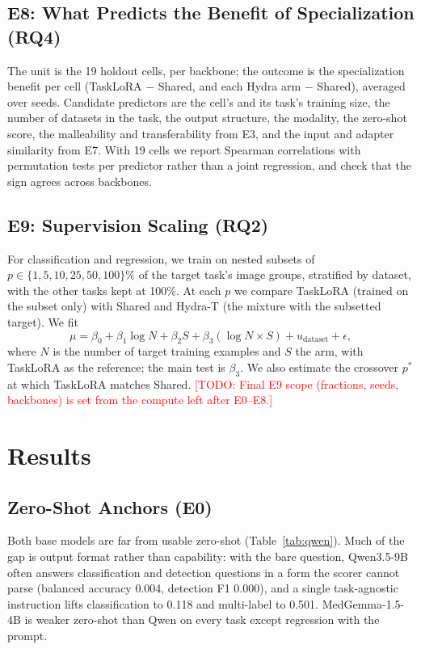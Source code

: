 \documentclass[journal,twoside,web]{ieeecolor}
\newcommand{\todo}[1]{\textcolor{red}{[TODO: #1]}}
\begin{document}
\subsection{E8: What Predicts the Benefit of Specialization (RQ4)}
\label{sec:e8}

The unit is the 19 holdout cells, per backbone; the outcome is the
specialization benefit per cell (TaskLoRA $-$ Shared, and each Hydra arm
$-$ Shared), averaged over seeds. Candidate predictors are the cell's and
its task's training size, the number of datasets in the task, the output
structure, the modality, the zero-shot score, the malleability and
transferability from E3, and the input and adapter similarity from E7. With
19 cells we report Spearman correlations with permutation tests per
predictor rather than a joint regression, and check that the sign agrees
across backbones.

\subsection{E9: Supervision Scaling (RQ2)}
\label{sec:e9}

For classification and regression, we train on nested subsets of
$p\in\{1,5,10,25,50,100\}\%$ of the target task's image groups, stratified by
dataset, with the other tasks kept at 100\%. At each $p$ we compare TaskLoRA
(trained on the subset only) with Shared and Hydra-T (the mixture with the
subsetted target). We fit
\begin{equation}
\mu=\beta_0+\beta_1\log N+\beta_2S+\beta_3(\log N\times S)+u_{\mathrm{dataset}}+\epsilon,
\end{equation}
where $N$ is the number of target training examples and $S$ the arm, with
TaskLoRA as the reference; the main test is $\beta_3$. We also estimate the
crossover $p^*$ at which TaskLoRA matches Shared.
\todo{Final E9 scope (fractions, seeds, backbones) is set from the compute
left after E0--E8.}


\section{Results}
\label{sec:results}

\subsection{Zero-Shot Anchors (E0)}

Both base models are far from usable zero-shot
(Table~\ref{tab:qwen}). Much of the gap is output
format rather than capability: with the bare question, Qwen3.5-9B often
answers classification and detection questions in a form the scorer cannot
parse (balanced accuracy 0.004, detection F1 0.000), and a single
task-agnostic instruction lifts classification to 0.118 and multi-label to
0.501. MedGemma-1.5-4B is weaker zero-shot than Qwen on every task except
regression with the prompt.
\end{document}
